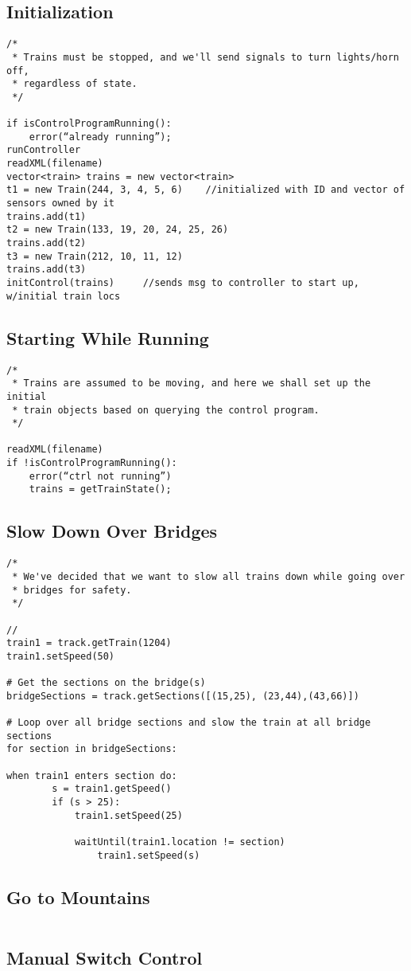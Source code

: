 \documentclass[a4paper,11pt,notitlepage]{article}
\begin{document}
\subsection{Initialization}
\begin{verbatim}
/*
 * Trains must be stopped, and we'll send signals to turn lights/horn off,
 * regardless of state.
 */

if isControlProgramRunning():
    error(“already running”);
runController
readXML(filename)
vector<train> trains = new vector<train>
t1 = new Train(244, 3, 4, 5, 6)    //initialized with ID and vector of sensors owned by it
trains.add(t1)
t2 = new Train(133, 19, 20, 24, 25, 26)
trains.add(t2)
t3 = new Train(212, 10, 11, 12)
trains.add(t3)
initControl(trains)     //sends msg to controller to start up, w/initial train locs
\end{verbatim}

\subsection{Starting While Running}
\begin{verbatim}
/*
 * Trains are assumed to be moving, and here we shall set up the initial 
 * train objects based on querying the control program.
 */

readXML(filename)
if !isControlProgramRunning():
    error(“ctrl not running”)
	trains = getTrainState();
\end{verbatim}

\subsection{Slow Down Over Bridges}
\begin{verbatim}
/*
 * We've decided that we want to slow all trains down while going over
 * bridges for safety.
 */

//
train1 = track.getTrain(1204)
train1.setSpeed(50)

# Get the sections on the bridge(s)
bridgeSections = track.getSections([(15,25), (23,44),(43,66)])

# Loop over all bridge sections and slow the train at all bridge sections
for section in bridgeSections:

when train1 enters section do:
        s = train1.getSpeed()
		if (s > 25):
			train1.setSpeed(25)

			waitUntil(train1.location != section)
			    train1.setSpeed(s)
\end{verbatim}
\subsection{Go to Mountains}
\begin{verbatim}
\end{verbatim}
\subsection{Manual Switch Control}
\begin{verbatim}
\end{verbatim}
\end{document}
